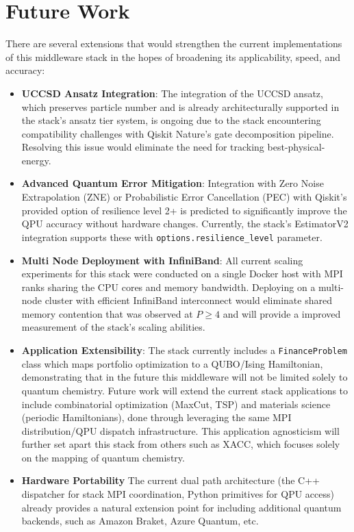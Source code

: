 \section{Future Work}
\label{sec:future}

There are several extensions that would strengthen the current implementations of this middleware 
stack in the hopes of broadening its applicability, speed, and accuracy:

\begin{itemize}
    \item \textbf{UCCSD Ansatz Integration}: The integration of the UCCSD ansatz, which preserves particle number and is already architecturally supported in the stack's ansatz tier system, is ongoing due to the stack encountering compatibility challenges with Qiskit Nature's gate decomposition pipeline. Resolving this issue would eliminate the need for tracking best-physical-energy. 
    \item \textbf{Advanced Quantum Error Mitigation}: Integration with Zero Noise Extrapolation (ZNE) or Probabilistic Error Cancellation (PEC) with Qiskit's provided option of resilience level 2+ is predicted to significantly improve the QPU accuracy without hardware changes. Currently, the stack's EstimatorV2 integration supports these with \texttt{options.resilience\_level} parameter.
    \item \textbf{Multi Node Deployment with InfiniBand}: All current scaling experiments for this stack were conducted on a single Docker host with MPI ranks sharing the CPU cores and memory bandwidth. Deploying on a multi-node cluster with efficient InfiniBand interconnect would eliminate shared memory contention that was observed at $P \geq 4$ and will provide a improved measurement of the stack's scaling abilities.
    \item \textbf{Application Extensibility}: The stack currently includes a \texttt{FinanceProblem} class which maps portfolio optimization to a QUBO/Ising Hamiltonian, demonstrating that in the future this middleware will not be limited solely to quantum chemistry. Future work will extend the current stack applications to include combinatorial optimization (MaxCut, TSP) and materials science (periodic Hamiltonians), done through leveraging the same MPI distribution/QPU dispatch infrastructure. This application agnosticism will further set apart this stack from others such as XACC, which focuses solely on the mapping of quantum chemistry.
    \item \textbf{Hardware Portability} The current dual path architecture (the C++ dispatcher for stack MPI coordination, Python primitives for QPU access) already provides a natural extension point for including additional quantum backends, such as Amazon Braket, Azure Quantum, etc.
\end{itemize}

